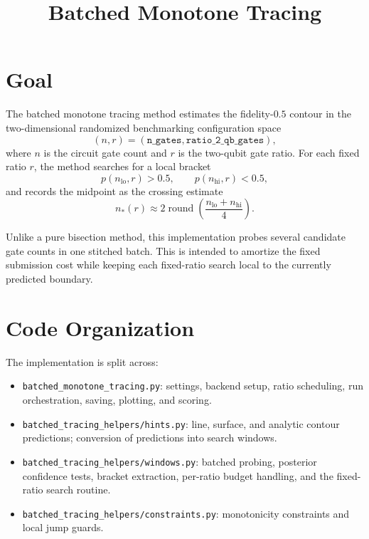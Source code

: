 \documentclass[11pt]{article}
\title{Batched Monotone Tracing}
\author{}
\date{}
\begin{document}
\maketitle

\section{Goal}

The batched monotone tracing method estimates the fidelity-$0.5$ contour in the
two-dimensional randomized benchmarking configuration space
\[
    (n, r) =
    (\texttt{n\_gates}, \texttt{ratio\_2\_qb\_gates}),
\]
where $n$ is the circuit gate count and $r$ is the two-qubit gate ratio.
For each fixed ratio $r$, the method searches for a local bracket
\[
    p(n_{\mathrm{lo}}, r) > 0.5,
    \qquad
    p(n_{\mathrm{hi}}, r) < 0.5,
\]
and records the midpoint as the crossing estimate
\[
    n_*(r) \approx
    2 \operatorname{round}\left(
        \frac{n_{\mathrm{lo}} + n_{\mathrm{hi}}}{4}
    \right).
\]

Unlike a pure bisection method, this implementation probes several candidate
gate counts in one stitched batch. This is intended to amortize the fixed
submission cost while keeping each fixed-ratio search local to the currently
predicted boundary.

\section{Code Organization}

The implementation is split across:

\begin{itemize}[leftmargin=*]
    \item \texttt{batched\_monotone\_tracing.py}: settings, backend setup,
    ratio scheduling, run orchestration, saving, plotting, and scoring.
    \item \texttt{batched\_tracing\_helpers/hints.py}: line, surface, and
    analytic contour predictions; conversion of predictions into search
    windows.
    \item \texttt{batched\_tracing\_helpers/windows.py}: batched probing,
    posterior confidence tests, bracket extraction, per-ratio budget handling,
    and the fixed-ratio search routine.
    \item \texttt{batched\_tracing\_helpers/constraints.py}: monotonicity
    constraints and local jump guards.
\end{itemize}
\end{document}
